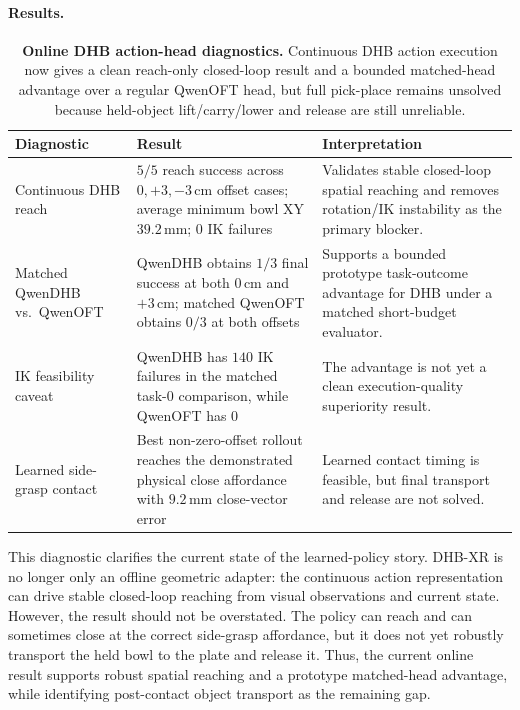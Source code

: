 \documentclass[11pt]{article}
\begin{document}
\paragraph{Results.}
\begin{table}[H]
  \centering
  \small
  \begin{tabularx}{\linewidth}{@{}lXX@{}}
    \toprule
    \textbf{Diagnostic} & \textbf{Result} & \textbf{Interpretation} \\
    \midrule
    Continuous DHB reach & $5/5$ reach success across $0,+3,-3$\,cm offset cases; average minimum bowl XY $39.2$\,mm; $0$ IK failures & Validates stable closed-loop spatial reaching and removes rotation/IK instability as the primary blocker. \\
    Matched QwenDHB vs.\ QwenOFT & QwenDHB obtains $1/3$ final success at both $0$\,cm and $+3$\,cm; matched QwenOFT obtains $0/3$ at both offsets & Supports a bounded prototype task-outcome advantage for DHB under a matched short-budget evaluator. \\
    IK feasibility caveat & QwenDHB has $140$ IK failures in the matched task-0 comparison, while QwenOFT has $0$ & The advantage is not yet a clean execution-quality superiority result. \\
    Learned side-grasp contact & Best non-zero-offset rollout reaches the demonstrated physical close affordance with $9.2$\,mm close-vector error & Learned contact timing is feasible, but final transport and release are not solved. \\
    \bottomrule
  \end{tabularx}
  \caption{\textbf{Online DHB action-head diagnostics.} Continuous DHB action execution now gives a clean reach-only closed-loop result and a bounded matched-head advantage over a regular QwenOFT head, but full pick-place remains unsolved because held-object lift/carry/lower and release are still unreliable.}
  \label{tab:online_action_head}
\end{table}

This diagnostic clarifies the current state of the learned-policy story. DHB-XR is no longer only an offline geometric adapter: the continuous action representation can drive stable closed-loop reaching from visual observations and current state. However, the result should not be overstated. The policy can reach and can sometimes close at the correct side-grasp affordance, but it does not yet robustly transport the held bowl to the plate and release it. Thus, the current online result supports robust spatial reaching and a prototype matched-head advantage, while identifying post-contact object transport as the remaining gap.
\end{document}
